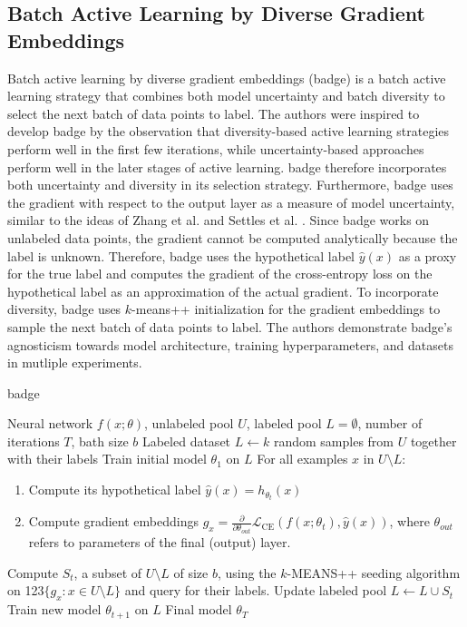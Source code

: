 \subsection{Batch Active Learning by Diverse Gradient Embeddings}
\label{sec:Related_work:Active_Learning:BADGE}
Batch active learning by diverse gradient embeddings (\gls{badge}) \cite{ash2019deep} is a batch active learning strategy that combines both model uncertainty
and batch diversity to select the next batch of data points to label. The authors were inspired to develop \gls{badge} by the observation that diversity-based
active learning strategies perform well in the first few iterations, while uncertainty-based approaches perform well in the later stages of active learning.
\gls{badge} therefore incorporates both uncertainty and diversity in its selection strategy. Furthermore, \gls{badge} uses the
gradient with respect to the output layer as a measure of model uncertainty, similar to the ideas of Zhang et al. \cite{zhang2017active} and Settles et al. \cite{settles2007multiple}.
Since \gls{badge} works on unlabeled data points, the gradient cannot be computed analytically because the label is unknown. Therefore, \gls{badge} uses the hypothetical
label $\hat{y}(x)$ as a proxy for the true label and computes the gradient of the cross-entropy loss on the hypothetical label as an approximation of the
actual gradient. To incorporate diversity, \gls{badge} uses $k$-means++ initialization \cite{arthur2007k} for the gradient embeddings to sample the next batch of data
points to label. The authors demonstrate \gls{badge}'s agnosticism towards model architecture, training hyperparameters, and datasets in mutliple experiments.
\begin{algorithm}
    \caption{\gls{badge}} \label{alg:Badge}
    \begin{algorithmic}[1]
        \Require Neural network $f(x;\theta)$, unlabeled pool $U$, labeled pool $L=\emptyset$, number of iterations $T$, bath size $b$
        \State Labeled dataset $L \leftarrow k$ random samples from $U$ together with their labels
        \State Train initial model $\theta_1$ on $L$
            \State For all examples $x$ in $U \setminus L$:
            \begin{enumerate}[leftmargin=0.8in]
                \item Compute its hypothetical label $\hat{y}(x) = h_{\theta_t}(x)$
                \item Compute gradient embeddings $g_x = \frac{\partial}{\partial \theta_{out}} \mathcal{L}_{\text{CE}}(f(x;\theta_t),\hat{y}(x))$, where
                $\theta_{out}$ refers to parameters of the final (output) layer.
            \end{enumerate}
            \State Compute $S_t$, a subset of $U \setminus L$ of size $b$, using the $k$-MEANS++ seeding algorithm on {\color{white} 123}$\{ g_x: x \in U
            \setminus L\}$ and query for their labels.
            \State Update labeled pool $L \leftarrow L \cup S_t$
            \State Train new model $\theta_{t+1}$ on $L$
        \EndFor
        \return Final model $\theta_T$
    \end{algorithmic}
\end{algorithm}

